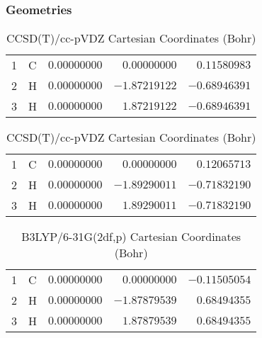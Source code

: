 \documentclass[10pt,oneside]{article}
\begin{document}
\clearpage

\subsection{}

\begin{table}[h!]
\subsubsection*{Geometries}
\begin{multicols}{2}
\centering
\caption{CCSD(T)/cc-pVTZ Cartesian Coordinates (Bohr)}
\begin{tabular}{llrrr}
\toprule
1  & C  & $ 0.00000000$ & $ 0.00000000$ & $ 0.11580983$ \\
2  & H  & $ 0.00000000$ & $-1.87219122$ & $-0.68946391$ \\
3  & H  & $ 0.00000000$ & $ 1.87219122$ & $-0.68946391$ \\
\bottomrule
\end{tabular}
\caption{CCSD(T)/cc-pVDZ Cartesian Coordinates (Bohr)}
\begin{tabular}{llrrr}
\toprule
1  & C  & $ 0.00000000$ & $ 0.00000000$ & $ 0.12065713$ \\
2  & H  & $ 0.00000000$ & $-1.89290011$ & $-0.71832190$ \\
3  & H  & $ 0.00000000$ & $ 1.89290011$ & $-0.71832190$ \\
\bottomrule
\end{tabular}
\end{multicols}
\end{table}

\begin{table}[h]
\centering
\caption{B3LYP/6-31G(2df,p) Cartesian Coordinates (Bohr)}
\begin{tabular}{llrrr}
\toprule
1  & C  & $ 0.00000000$ & $ 0.00000000$ & $-0.11505054$ \\
2  & H  & $ 0.00000000$ & $-1.87879539$ & $ 0.68494355$ \\
3  & H  & $ 0.00000000$ & $ 1.87879539$ & $ 0.68494355$ \\
\bottomrule
\end{tabular}
\end{table}
\end{document}
